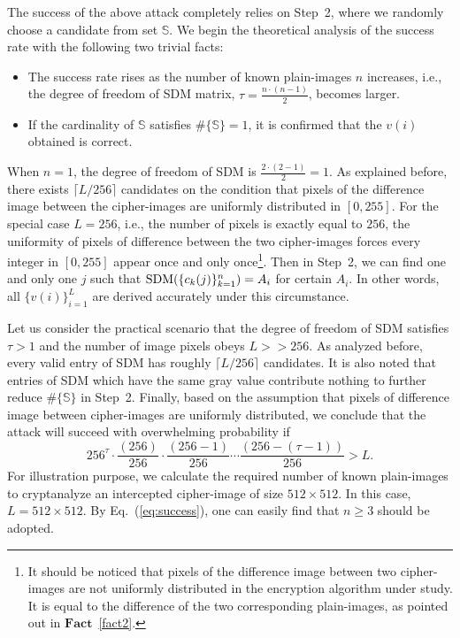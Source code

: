 \documentclass[smallextended, final]{svjour3}          \smartqed
\newcommand\SDM{{\rm SDM}}
\begin{document}
The success of the above attack completely relies on Step~2, where we randomly choose a candidate from set $\mathbb{S}$.
We begin the theoretical analysis of the success rate with the following two trivial facts:
\begin{itemize}
\item The success rate rises as the number of known plain-images $n$ increases, i.e., the degree of freedom of SDM matrix, $ \tau = \frac {n\cdot (n-1)} {2}$, becomes larger.
\item If the cardinality of $\mathbb{S}$ satisfies $\# \{ \mathbb{S} \}=1$, it is confirmed that the $v(i)$ obtained is correct.
\end{itemize}
When $n=1$, the degree of freedom of SDM is $\frac {2\cdot (2-1)} {2} =1$. As explained before, there exists $\lceil L/256 \rceil$ candidates on the condition that pixels of the difference
image between the cipher-images are uniformly distributed in $[0,255]$.
For the special case $L=256$, i.e., the number of pixels is exactly equal to $256$, the uniformity of pixels of difference between the two cipher-images forces every integer in $[0,255]$ appear once and only
once\footnote{It should be noticed that pixels of the difference image between two cipher-images are not uniformly distributed in the encryption algorithm under study.
It is equal to the difference of the two corresponding plain-images, as pointed out in $\mathbf{Fact}$~\ref{fact2}.}.
Then in Step~2, we can find one and only one $j$ such that $\SDM(\{c_{k}(j)\}_{k=1}^{n}) =  A_i$ for certain $A_i$.
In other words, all $\{v(i)\}_{i=1}^{L}$ are derived accurately under this circumstance.

Let us consider the practical scenario that the degree of freedom of SDM satisfies $\tau  >1$ and the number of image pixels obeys $L>>256$.
As analyzed before, every valid entry of SDM has roughly $\lceil L/256 \rceil$ candidates. It is also noted that entries of SDM which have the same
gray value contribute nothing to further reduce $\# \{ \mathbb{S} \}$ in Step~2. Finally, based on the assumption that
pixels of difference image between cipher-images are uniformly distributed, we conclude that the attack will succeed with overwhelming probability if
\begin{equation}
\label{eq:success}
256^{\tau} \cdot \frac {(256)} {256} \cdot \frac {(256-1)} {256} \cdots  \frac {(256-(\tau-1))} {256} > L.
\end{equation}
For illustration purpose, we calculate the required number of known plain-images to cryptanalyze an intercepted cipher-image of size $512\times 512$.
In this case, $L = 512\times 512$. By Eq.~(\ref{eq:success}), one can easily find that $n \geq 3$ should be adopted.
\end{document}
